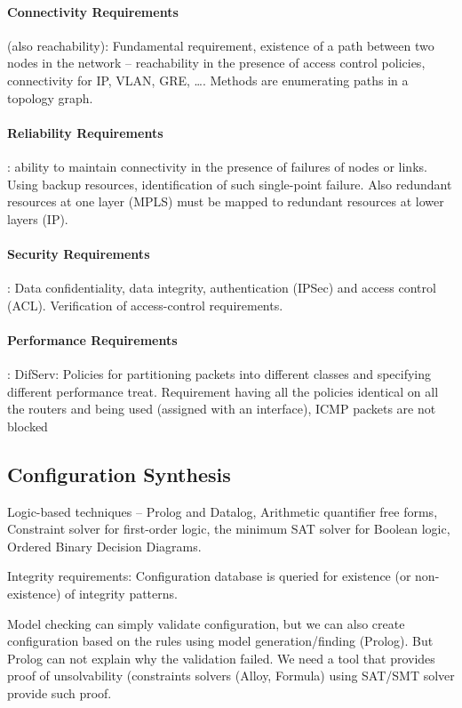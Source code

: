 \documentclass[a4paper, 11pt]{report}
\begin{document}
\paragraph{Connectivity Requirements} (also reachability): Fundamental requirement, existence of a path between two nodes in the network -- reachability in the presence of access control policies, connectivity for IP, VLAN, GRE, \dots. Methods are enumerating paths in a topology graph.

\paragraph{Reliability Requirements}: ability to maintain connectivity in the presence of failures of nodes or links. Using backup resources, identification of such single-point failure. Also redundant resources at one layer (MPLS) must be mapped to redundant resources at lower layers (IP).

\paragraph{Security Requirements}: Data confidentiality, data integrity, authentication (IPSec) and access control (ACL). Verification of access-control requirements.

\paragraph{Performance Requirements}: DifServ: Policies for partitioning packets into different classes and specifying different performance treat. Requirement having all the policies identical on all the routers and being used (assigned with an interface), ICMP packets are not blocked

\subsection{Configuration Synthesis}
Logic-based techniques -- Prolog and Datalog, Arithmetic quantifier free forms, Constraint solver for first-order logic, the minimum SAT solver for Boolean logic, Ordered Binary Decision Diagrams.

Integrity requirements: Configuration database is queried for existence (or non-existence) of integrity patterns.

Model checking can simply validate configuration, but we can also create configuration based on the rules using model generation/finding (Prolog). But Prolog can not explain why the validation failed. We need a tool that provides proof of unsolvability (constraints solvers (Alloy, Formula) using SAT/SMT solver provide such proof.
\end{document}
